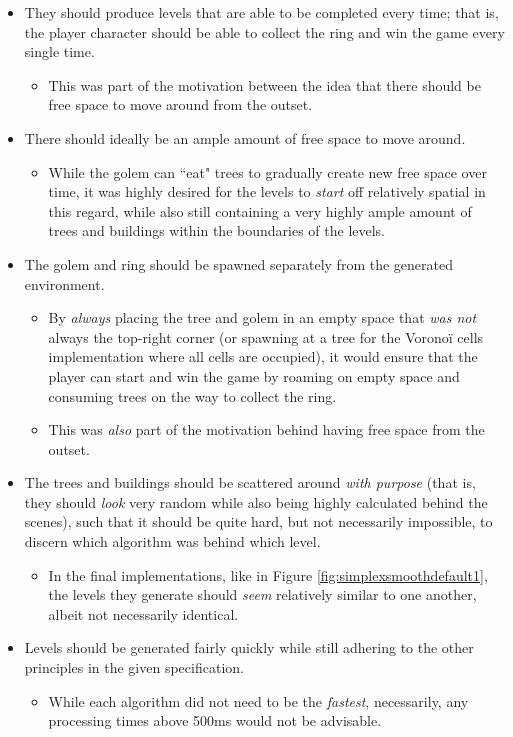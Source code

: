 \begin{itemize}
    \item They should produce levels that are able to be completed every time; that is, the player character should be able to collect the ring and win the game every single time.
    \begin{itemize}
        \item This was part of the motivation between the idea that there should be free space to move around from the outset.
    \end{itemize}
    \item There should ideally be an ample amount of free space to move around.
    \begin{itemize}
        \item While the golem can ``eat" trees to gradually create new free space over time, it was highly desired for the levels to \textit{start} off relatively spatial in this regard, while also still containing a very highly ample amount of trees and buildings within the boundaries of the levels.
    \end{itemize}
    \item The golem and ring should be spawned separately from the generated environment.
    \begin{itemize}
        \item By \textit{always} placing the tree and golem in an empty space that \textit{was not} always the top-right corner (or spawning at a tree for the Voronoï cells implementation where all cells are occupied), it would ensure that the player can start and win the game by roaming on empty space and consuming trees on the way to collect the ring.
        \item This was \textit{also} part of the motivation behind having free space from the outset.
    \end{itemize}
    \item The trees and buildings should be scattered around \textit{with purpose} (that is, they should \textit{look} very random while also being highly calculated behind the scenes), such that it should be quite hard, but not necessarily impossible, to discern which algorithm was behind which level.
    \begin{itemize}
        \item In the final implementations, like in Figure \ref{fig:simplexsmoothdefault1}, the levels they generate should \textit{seem} relatively similar to one another, albeit not necessarily identical.
    \end{itemize}
    \item Levels should be generated fairly quickly while still adhering to the other principles in the given specification.
    \begin{itemize}
        \item While each algorithm did not need to be the \textit{fastest}, necessarily, any processing times above 500ms would not be advisable.
    \end{itemize}
\end{itemize}

